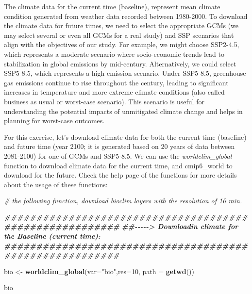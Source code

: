 \documentclass[
]{article}
\newenvironment{Shaded}{\begin{snugshade}}{\end{snugshade}}
\newcommand{\AttributeTok}[1]{\textcolor[rgb]{0.13,0.29,0.53}{#1}}
\newcommand{\CommentTok}[1]{\textcolor[rgb]{0.56,0.35,0.01}{\textit{#1}}}
\newcommand{\DecValTok}[1]{\textcolor[rgb]{0.00,0.00,0.81}{#1}}
\newcommand{\DocumentationTok}[1]{\textcolor[rgb]{0.56,0.35,0.01}{\textbf{\textit{#1}}}}
\newcommand{\FunctionTok}[1]{\textcolor[rgb]{0.13,0.29,0.53}{\textbf{#1}}}
\newcommand{\NormalTok}[1]{#1}
\newcommand{\OtherTok}[1]{\textcolor[rgb]{0.56,0.35,0.01}{#1}}
\newcommand{\StringTok}[1]{\textcolor[rgb]{0.31,0.60,0.02}{#1}}
\begin{document}
The climate data for the current time (baseline), represent mean climate
condition generated from weather data recorded between 1980-2000. To
download the climate data for future times, we need to select the
appropriate GCMs (we may select several or even all GCMs for a real
study) and SSP scenarios that align with the objectives of our study.
For example, we might choose SSP2-4.5, which represents a moderate
scenario where socio-economic trends lead to stabilization in global
emissions by mid-century. Alternatively, we could select SSP5-8.5, which
represents a high-emission scenario. Under SSP5-8.5, greenhouse gas
emissions continue to rise throughout the century, leading to
significant increases in temperature and more extreme climate conditions
(also called business as usual or worst-case scenario). This scenario is
useful for understanding the potential impacts of unmitigated climate
change and helps in planning for worst-case outcomes.

For this exercise, let's download climate data for both the current time
(baseline) and future time (year 2100; it is generated based on 20 years
of data between 2081-2100) for one of GCMs and SSP5-8.5. We can use the
\emph{worldclim\_global} function to download climate data for the
current time, and cmip6\_world to download for the future. Check the
help page of the functions for more details about the usage of these
functions:

\begin{Shaded}
\begin{Highlighting}[]
\CommentTok{\# the following function, download bioclim layers with the resolution of 10 min.}

\DocumentationTok{\#\#\#\#\#\#\#\#\#\#\#\#\#\#\#\#\#\#\#\#\#\#\#\#\#\#\#\#\#\#\#\#\#\#\#\#\#\#\#\#\#\#\#\#\#\#\#\#\#\#\#\#\#\#\#\#}
\DocumentationTok{\#\#{-}{-}{-}{-}{-}\textgreater{} Downloadin climate for the Baseline (current time):}
\DocumentationTok{\#\#\#\#\#\#\#\#\#\#\#\#\#\#\#\#\#\#\#\#\#\#\#\#\#\#\#\#\#\#\#\#\#\#\#\#\#\#\#\#\#\#\#\#\#\#\#\#\#\#\#\#\#\#\#\#}

\NormalTok{bio }\OtherTok{\textless{}{-}} \FunctionTok{worldclim\_global}\NormalTok{(}\AttributeTok{var=}\StringTok{"bio"}\NormalTok{,}\AttributeTok{res=}\DecValTok{10}\NormalTok{, }\AttributeTok{path =} \FunctionTok{getwd}\NormalTok{())}

\NormalTok{bio}
\end{Highlighting}
\end{Shaded}
\end{document}
